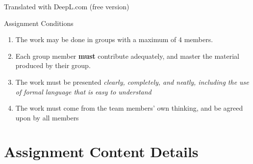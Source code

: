 Translated with DeepL.com (free version)

\begin{infobox}{Assignment Conditions}
\begin{enumerate}
    \itemsep0em
     \item The work may be done in groups with a maximum of 4 members.
     \item Each group member \textbf{must} contribute adequately, and master the material produced by their group.
     \item The work must be presented \textit{clearly, completely, and neatly, including the use of formal language that is easy to understand}
     \item The work must come from the team members' own thinking, and be agreed upon by all members
\end{enumerate}  
\end{infobox}

\section{Assignment Content Details}
